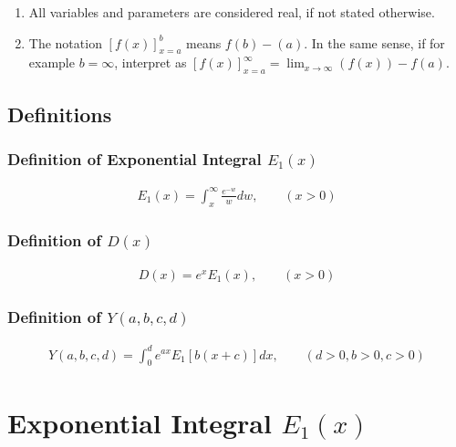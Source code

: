 \documentclass[bibliography=totocnumbered]{scrartcl}
\newcommand{\assume}[1][\text{MISSING PARAMETER}]{,\qquad\left(#1\right)}
\begin{document}
	\begin{enumerate}
		\item All variables and parameters are considered real, if not stated otherwise.
		\item The notation $\left[f\left(x\right)\right]_{x=a}^{b}$ means $f\left(b\right)-\left(a\right)$. In the same sense, if for example $b=\infty$, interpret as $\left[f\left(x\right)\right]_{x=a}^{\infty}=\lim_{x\rightarrow{}\infty}\left(f\left(x\right)\right)-f\left(a\right)$.
	\end{enumerate}

	\subsection{Definitions}

	\subsubsection[Definition of Exponential Integral]{Definition of Exponential Integral $E_1\left(x\right)$}

	\begin{gather}
		E_1\left(x\right)=\int_{x}^{\infty}\frac{e^{-w}}{w}dw\assume[x>0]\label{eq: E1}
	\end{gather}

	\subsubsection[Definition of D(x)]{Definition of $D\left(x\right)$}
	\label{subsubsec: D}

	\begin{gather}
		D\left(x\right)=e^xE_1\left(x\right)\assume[x>0]\label{eq: D}
	\end{gather}

	\subsubsection[Definition of Y(a,b,c,d)]{Definition of $Y\left(a, b, c, d\right)$}

	\begin{gather}
		Y\left(a, b, c, d\right)=\int_{0}^{d}e^{ax}E_1\left[b\left(x+c\right)\right]dx\assume[d>0,b>0,c>0]\label{eq: Y}
	\end{gather}

	\clearpage

	\section[Exponential Integral]{Exponential Integral $E_1\left(x\right)$}
\end{document}
